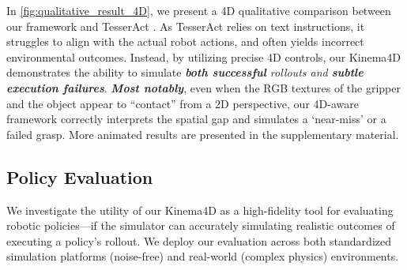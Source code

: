 In \cref{fig:qualitative_result_4D}, we present a 4D qualitative comparison between our framework and TesserAct \cite{zhen2025tesseract}. As TesserAct relies on text instructions, it struggles to align with the actual robot actions, and often yields incorrect environmental outcomes.
Instead, by utilizing precise 4D controls, our Kinema4D demonstrates the ability to simulate \textit{\textbf{both successful} rollouts and \textbf{subtle execution failures}}. \textit{\textbf{Most notably}}, even when the RGB textures of the gripper and the object appear to “contact” from a 2D perspective, our 4D-aware framework correctly interprets the spatial gap and simulates a `near-miss' or a failed grasp.
More animated results are presented in the supplementary material.

\subsection{Policy Evaluation}
We investigate the utility of our Kinema4D as a high-fidelity tool for evaluating robotic policies—if the simulator can accurately simulating realistic outcomes of executing a policy's rollout.
We deploy our evaluation across both standardized simulation platforms (noise-free) and real-world (complex physics) environments.

